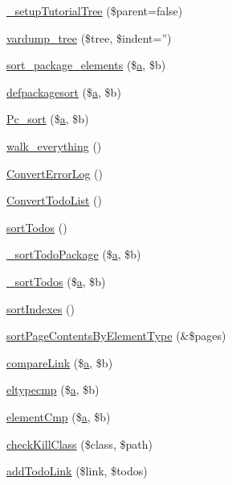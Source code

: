 \begin{DoxyCompactItemize}
\item 
\hyperlink{class_converter_ac73cf9c6cc52922a6245e6acdd77f70a}{\-\_\-setup\-Tutorial\-Tree} (\$parent=false)
\item 
\hyperlink{class_converter_ad4374d86902a775bf42013a1f24039b1}{vardump\-\_\-tree} (\$tree, \$indent='')
\item 
\hyperlink{class_converter_a02b2e4b8dcf723bc36ab0286c9c2c161}{sort\-\_\-package\-\_\-elements} (\$\hyperlink{classa}{a}, \$b)
\item 
\hyperlink{class_converter_a506c59bbd4603af7e496e7bb468ea886}{defpackagesort} (\$\hyperlink{classa}{a}, \$b)
\item 
\hyperlink{class_converter_af9ec0d56f885b71cf5cf193ad96099e0}{\-Pc\-\_\-sort} (\$\hyperlink{classa}{a}, \$b)
\item 
\hyperlink{class_converter_abea1c1dfb69c7b0d32e74684dbbb19fb}{walk\-\_\-everything} ()
\item 
\hyperlink{class_converter_a5a02e88d6dba03b66f46fd411e5ac2c2}{\-Convert\-Error\-Log} ()
\item 
\hyperlink{class_converter_a756b83c7febf175624cf1d2562bf02ae}{\-Convert\-Todo\-List} ()
\item 
\hyperlink{class_converter_a2560c18a2f5984767ecd4cd766ca20af}{sort\-Todos} ()
\item 
\hyperlink{class_converter_a3c77dc568ef274bd549283099c7821e3}{\-\_\-sort\-Todo\-Package} (\$\hyperlink{classa}{a}, \$b)
\item 
\hyperlink{class_converter_a92cdcda358c235d26c2ee6848c94eeec}{\-\_\-sort\-Todos} (\$\hyperlink{classa}{a}, \$b)
\item 
\hyperlink{class_converter_ab8a03618f1a6cd5b9625a756500dda6a}{sort\-Indexes} ()
\item 
\hyperlink{class_converter_ab0ed75f019c0bd4d74b771a1ac138cb7}{sort\-Page\-Contents\-By\-Element\-Type} (\&\$pages)
\item 
\hyperlink{class_converter_a6a8b270376f57ea01d55f61197ced29f}{compare\-Link} (\$\hyperlink{classa}{a}, \$b)
\item 
\hyperlink{class_converter_a47c24f50ab60043ce45eece43a8bcd3b}{eltypecmp} (\$\hyperlink{classa}{a}, \$b)
\item 
\hyperlink{class_converter_ab68c29852d8512dce6e543479b51e24a}{element\-Cmp} (\$\hyperlink{classa}{a}, \$b)
\item 
\hyperlink{class_converter_aa8ac49bca3549ebe7ed50e144f4596b0}{check\-Kill\-Class} (\$class, \$path)
\item 
\hyperlink{class_converter_a3a06e4a7329f68ebc1d29b98550be50f}{add\-Todo\-Link} (\$link, \$todos)

\end{DoxyCompactItemize}
